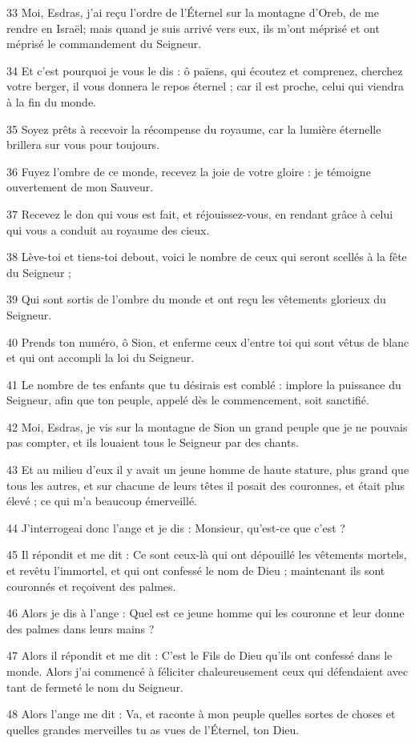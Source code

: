 \par 33 Moi, Esdras, j'ai reçu l'ordre de l'Éternel sur la montagne d'Oreb, de me rendre en Israël; mais quand je suis arrivé vers eux, ils m'ont méprisé et ont méprisé le commandement du Seigneur.
\par 34 Et c'est pourquoi je vous le dis : ô païens, qui écoutez et comprenez, cherchez votre berger, il vous donnera le repos éternel ; car il est proche, celui qui viendra à la fin du monde.
\par 35 Soyez prêts à recevoir la récompense du royaume, car la lumière éternelle brillera sur vous pour toujours.
\par 36 Fuyez l'ombre de ce monde, recevez la joie de votre gloire : je témoigne ouvertement de mon Sauveur.
\par 37 Recevez le don qui vous est fait, et réjouissez-vous, en rendant grâce à celui qui vous a conduit au royaume des cieux.
\par 38 Lève-toi et tiens-toi debout, voici le nombre de ceux qui seront scellés à la fête du Seigneur ;
\par 39 Qui sont sortis de l'ombre du monde et ont reçu les vêtements glorieux du Seigneur.
\par 40 Prends ton numéro, ô Sion, et enferme ceux d'entre toi qui sont vêtus de blanc et qui ont accompli la loi du Seigneur.
\par 41 Le nombre de tes enfants que tu désirais est comblé : implore la puissance du Seigneur, afin que ton peuple, appelé dès le commencement, soit sanctifié.
\par 42 Moi, Esdras, je vis sur la montagne de Sion un grand peuple que je ne pouvais pas compter, et ils louaient tous le Seigneur par des chants.
\par 43 Et au milieu d'eux il y avait un jeune homme de haute stature, plus grand que tous les autres, et sur chacune de leurs têtes il posait des couronnes, et était plus élevé ; ce qui m'a beaucoup émerveillé.
\par 44 J'interrogeai donc l'ange et je dis : Monsieur, qu'est-ce que c'est ?
\par 45 Il répondit et me dit : Ce sont ceux-là qui ont dépouillé les vêtements mortels, et revêtu l'immortel, et qui ont confessé le nom de Dieu ; maintenant ils sont couronnés et reçoivent des palmes.
\par 46 Alors je dis à l'ange : Quel est ce jeune homme qui les couronne et leur donne des palmes dans leurs mains ?
\par 47 Alors il répondit et me dit : C'est le Fils de Dieu qu'ils ont confessé dans le monde. Alors j’ai commencé à féliciter chaleureusement ceux qui défendaient avec tant de fermeté le nom du Seigneur.
\par 48 Alors l'ange me dit : Va, et raconte à mon peuple quelles sortes de choses et quelles grandes merveilles tu as vues de l'Éternel, ton Dieu.

